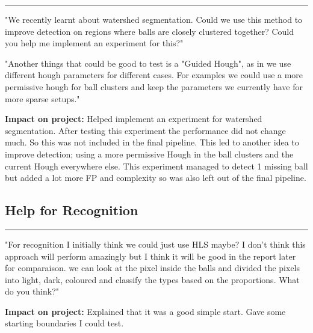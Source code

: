 \documentclass[12pt,a4paper]{article}
\newenvironment{promptentry}{%
    \par\Needspace{7\baselineskip}\addvspace{1.2em}
    \hrule
    \nobreak\vspace{0.5em}
}{\par\addvspace{0.5em}}
\newenvironment{aiprompt}{%
    \begin{list}{}{%
        \setlength{\leftmargin}{1em}%
        \setlength{\rightmargin}{1em}%
        \setlength{\topsep}{0.3em}%
        \setlength{\parsep}{0pt}%
    }%
    \item\relax
}{\end{list}}
\begin{document}
\begin{promptentry}

\begin{aiprompt}
"We recently learnt about watershed segmentation. Could we use this method to improve
detection on regions where balls are closely clustered together?
Could you help me implement an experiment for this?"
\end{aiprompt}

\begin{aiprompt}
"Another things that could be good to test is a "Guided Hough", as in we use different hough
parameters for different cases. For examples we could use a more permissive hough for ball clusters
and keep the parameters we currently have for more sparse setups."
\end{aiprompt}

\textbf{Impact on project:} Helped implement an experiment for watershed segmentation. 
After testing this experiment the performance did not change much. So this was not included in the
final pipeline. This led to another idea to improve detection; using a more permissive Hough in
the ball clusters and the current Hough everywhere else. This experiment managed to detect 1 missing ball
but added a lot more FP and complexity so was also left out of the final pipeline.

\end{promptentry}
\FloatBarrier

\subsection{Help for Recognition}

\begin{promptentry}

\begin{aiprompt}
"For recognition I initially think we could just use HLS maybe?
I don't think this approach will perform amazingly but I think it 
will be good in the report later for comparaison.
we can look at the pixel inside the balls and divided the pixels
into light, dark, coloured and classify the types based on the proportions.
What do you think?"
\end{aiprompt}

\textbf{Impact on project:} Explained that it was a good simple start. 
Gave some starting boundaries I could test.

\end{promptentry}
\FloatBarrier
\end{document}
